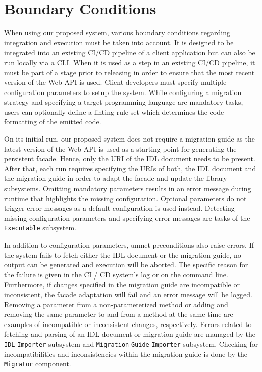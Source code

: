\section{Boundary Conditions}
\label{sec:BoundaryConditions}

When using our proposed system, various boundary conditions regarding integration and execution must be taken into account. It is designed to be integrated into an existing CI/CD pipeline of a client application but can also be run locally via a CLI. When it is used as a step in an existing CI/CD pipeline, it must be part of a stage prior to releasing in order to ensure that the most recent version of the Web API is used. Client developers must specify multiple configuration parameters to setup the system. While configuring a migration strategy and specifying a target programming language are mandatory tasks, users can optionally define a linting rule set which determines the code formatting of the emitted code. 

On its initial run, our proposed system does not require a migration guide as the latest version of the Web API is used as a starting point for generating the persistent facade. Hence, only the \ac{URI} of the IDL document needs to be present. After that, each run requires specifying the \acp{URI} of both, the IDL document and the migration guide in order to adapt the facade and update the library subsystems. Omitting mandatory parameters results in an error message during runtime that highlights the missing configuration. Optional parameters do not trigger error messages as a default configuration is used instead. Detecting missing configuration parameters and specifying error messages are tasks of the \texttt{Executable} subsystem.

In addition to configuration parameters, unmet preconditions also raise errors. If the system fails to fetch either the IDL document or the migration guide, no output can be generated and execution will be aborted. The specific reason for the failure is given in the CI / CD system's log or on the command line. Furthermore, if changes specified in the migration guide are incompatible or inconsistent, the facade adaptation will fail and an error message will be logged. Removing a parameter from a non-parameterized method or adding and removing the same parameter to and from a method at the same time are examples of incompatible or inconsistent changes, respectively. Errors related to fetching and parsing of an IDL document or migration guide are managed by the \texttt{IDL} \texttt{Importer} subsystem and \texttt{Migration} \texttt{Guide} \texttt{Importer} subsystem. Checking for incompatibilities and inconsistencies within the migration guide is done by the \texttt{Migrator} component.



